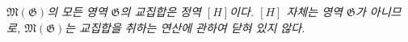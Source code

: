 
\emph{$\mathfrak M(\mathfrak G)$의 모든 영역 $\mathfrak G$의 교집합은 정역 $[H]$이다. $[H]$ 자체는 영역 $\mathfrak G$가 아니므로, $\mathfrak M(\mathfrak G)$는 교집합을 취하는 연산에 관하여 닫혀 있지 않다.}
